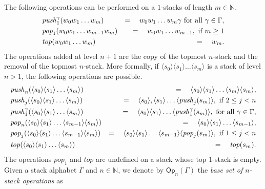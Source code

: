 \documentclass[a4paper,UKenglish,cleveref, autoref, thm-restate]{lipics-v2021}
\newcommand{\N}{\mathbb{N}}
\newcommand{\Op}{\mathsf{Op}}
\begin{document}
The following operations can be performed on a $1$-stacks of length $m \in \N$.
\begin{eqnarray*}
&\text{\textit{push}}_1^\gamma( w_0 w_1 \ldots w_m) &=\quad w_0 w_1 \ldots w_m \gamma   \text{ for all } \gamma \in  \Gamma, \\
&\text{\textit{pop}}_1(w_0 w_1 \ldots w_{m-1} w_m ) &=\quad w_0 w_1 \ldots w_{m-1}, \text{ if } m \geq 1\\
&\text{\textit{top}}( w_0 w_1 \ldots w_m ) &=\quad w_m.
\end{eqnarray*}
The operations added at level $n+1$ are the copy of the topmost $n$-stack
and the removal of the topmost $n$-stack.
More formally, if $ \langle s_0 \rangle \langle s_1 \rangle \ldots \langle s_m \rangle$ is a stack of 
level $n > 1$, 
the following operations are possible.
%
\begin{eqnarray*}
&\text{\textit{push}}_n( \langle s_0 \rangle \langle s_1 \rangle \ldots \langle s_m \rangle) &=\quad  \langle s_0 \rangle \langle s_1 \rangle \ldots \langle s_m \rangle \langle s_m \rangle , \\
&\text{\textit{push}}_j( \langle s_0 \rangle \langle s_1 \rangle \ldots \langle s_m \rangle) &=\quad \langle s_0 \rangle, \langle s_1 \rangle \ldots 
\langle \text{\textit{push}}_j(s_m) \rangle,
\text{ if } 2 \leq j < n\\
&\text{\textit{push}}_1^\gamma( \langle s_0 \rangle \langle s_1 \rangle \ldots \langle s_m \rangle) &= \quad
\langle s_0 \rangle \langle s_1 \rangle \ldots 
\langle \text{\textit{push}}_1^\gamma(s_m) \rangle,
\text{ for all } \gamma \in \Gamma,\\
&\text{\textit{pop}}_n( \langle s_0 \rangle \langle s_1 \rangle \ldots \langle s_{m-1} \rangle \langle s_m \rangle) &= \quad
\langle s_0 \rangle \langle s_1 \rangle \ldots \langle s_{m-1} \rangle
,\\
&\text{\textit{pop}}_j( \langle s_0 \rangle \langle s_1 \rangle \ldots \langle s_{m-1} \rangle \langle s_m \rangle) &= \quad
\langle s_0 \rangle \langle s_1 \rangle \ldots \langle s_{m-1} \rangle
\langle \text{\textit{pop}}_j(s_m) \rangle,
\text{ if } 1 \leq j < n\\
&\text{\textit{top}}( \langle s_0 \rangle \langle s_1 \rangle \ldots \langle s_m \rangle) &=\quad
\text{\textit{top}}(s_m).
\end{eqnarray*}
The operations $pop_1$ and $top$ are undefined on a stack whose top $1$-stack is empty.  \\


Given a stack alphabet $\Gamma$ and $n \in \N$, 
we denote by  $\Op_n(\Gamma)$ the {\em base set of $n$-stack operations} as
\end{document}
